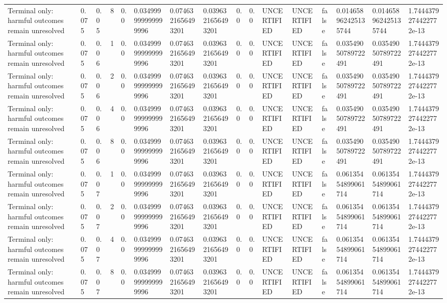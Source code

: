 \begin{tabular}{llllllllllllllll}
Terminal only: harmful outcomes remain unresolved & 0.075 & 0.05 & 8 & 0.0 & 0.034999999999999996 & 0.0746321656493201 & 0.0396321656493201 & 0.0 & 0.0 & UNCERTIFIED & UNCERTIFIED & false & 0.014658962425135744 & 0.014658962425135744 & 1.7444379274422772e-13 \\
Terminal only: harmful outcomes remain unresolved & 0.075 & 0.06 & 1 & 0.0 & 0.034999999999999996 & 0.0746321656493201 & 0.0396321656493201 & 0.0 & 0.0 & UNCERTIFIED & UNCERTIFIED & false & 0.03549050789722491 & 0.03549050789722491 & 1.7444379274422772e-13 \\
Terminal only: harmful outcomes remain unresolved & 0.075 & 0.06 & 2 & 0.0 & 0.034999999999999996 & 0.0746321656493201 & 0.0396321656493201 & 0.0 & 0.0 & UNCERTIFIED & UNCERTIFIED & false & 0.03549050789722491 & 0.03549050789722491 & 1.7444379274422772e-13 \\
Terminal only: harmful outcomes remain unresolved & 0.075 & 0.06 & 4 & 0.0 & 0.034999999999999996 & 0.0746321656493201 & 0.0396321656493201 & 0.0 & 0.0 & UNCERTIFIED & UNCERTIFIED & false & 0.03549050789722491 & 0.03549050789722491 & 1.7444379274422772e-13 \\
Terminal only: harmful outcomes remain unresolved & 0.075 & 0.06 & 8 & 0.0 & 0.034999999999999996 & 0.0746321656493201 & 0.0396321656493201 & 0.0 & 0.0 & UNCERTIFIED & UNCERTIFIED & false & 0.03549050789722491 & 0.03549050789722491 & 1.7444379274422772e-13 \\
Terminal only: harmful outcomes remain unresolved & 0.075 & 0.07 & 1 & 0.0 & 0.034999999999999996 & 0.0746321656493201 & 0.0396321656493201 & 0.0 & 0.0 & UNCERTIFIED & UNCERTIFIED & false & 0.06135454899061714 & 0.06135454899061714 & 1.7444379274422772e-13 \\
Terminal only: harmful outcomes remain unresolved & 0.075 & 0.07 & 2 & 0.0 & 0.034999999999999996 & 0.0746321656493201 & 0.0396321656493201 & 0.0 & 0.0 & UNCERTIFIED & UNCERTIFIED & false & 0.06135454899061714 & 0.06135454899061714 & 1.7444379274422772e-13 \\
Terminal only: harmful outcomes remain unresolved & 0.075 & 0.07 & 4 & 0.0 & 0.034999999999999996 & 0.0746321656493201 & 0.0396321656493201 & 0.0 & 0.0 & UNCERTIFIED & UNCERTIFIED & false & 0.06135454899061714 & 0.06135454899061714 & 1.7444379274422772e-13 \\
Terminal only: harmful outcomes remain unresolved & 0.075 & 0.07 & 8 & 0.0 & 0.034999999999999996 & 0.0746321656493201 & 0.0396321656493201 & 0.0 & 0.0 & UNCERTIFIED & UNCERTIFIED & false & 0.06135454899061714 & 0.06135454899061714 & 1.7444379274422772e-13 \\

\end{tabular}
